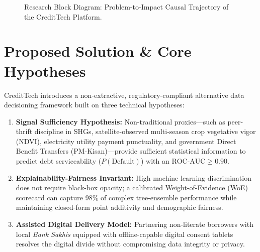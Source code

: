 \begin{figure}[H]
\caption{Research Block Diagram: Problem-to-Impact Causal Trajectory of the CreditTech Platform.}
\label{fig:problem_solution_chain}
\end{figure}

\section{Proposed Solution \& Core Hypotheses}
CreditTech introduces a non-extractive, regulatory-compliant alternative data decisioning framework built on three technical hypotheses:
\begin{enumerate}
  \item \textbf{Signal Sufficiency Hypothesis:} Non-traditional proxies---such as peer-thrift discipline in SHGs, satellite-observed multi-season crop vegetative vigor (NDVI), electricity utility payment punctuality, and government Direct Benefit Transfers (PM-Kisan)---provide sufficient statistical information to predict debt serviceability ($P(\text{Default})$) with an $\text{ROC-AUC} \ge 0.90$.
  \item \textbf{Explainability-Fairness Invariant:} High machine learning discrimination does not require black-box opacity; a calibrated Weight-of-Evidence (WoE) scorecard can capture 98\% of complex tree-ensemble performance while maintaining closed-form point additivity and demographic fairness.
  \item \textbf{Assisted Digital Delivery Model:} Partnering non-literate borrowers with local \textit{Bank Sakhis} equipped with offline-capable digital consent tablets resolves the digital divide without compromising data integrity or privacy.
\end{enumerate}

